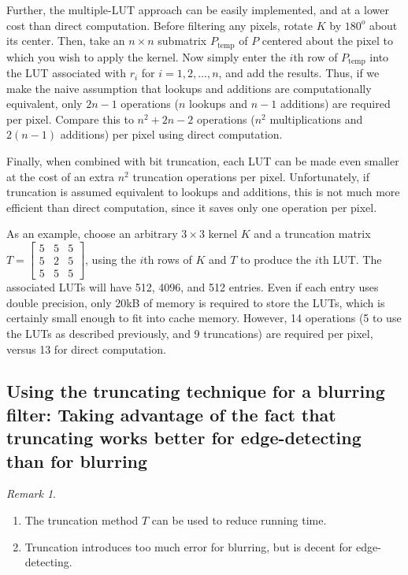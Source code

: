 \documentclass[12pt]{amsart}
\theoremstyle{definition}
\theoremstyle{remark}
\newtheorem{rem}[thm]{Remark}
\numberwithin{thm}{section}
\begin{document}
Further, the multiple-LUT approach can be easily implemented, and at a lower cost than direct computation. Before filtering any pixels, rotate $K$ by $180^o$ about its center. Then, take an $n\times n$ submatrix $P_{\mathrm{temp}}$ of $P$ centered about the pixel to which you wish to apply the kernel. Now simply enter the $i$th row of $P_{\mathrm{temp}}$ into the LUT associated with $r_i$ for $i = 1,2,\ldots,n$, and add the results. Thus, if we make the naive assumption that lookups and additions are computationally equivalent, only $2n-1$ operations ($n$ lookups and $n-1$ additions) are required per pixel. Compare this to $n^2+2n-2$ operations ($n^2$ multiplications and $2(n-1)$ additions) per pixel using direct computation.

Finally, when combined with bit truncation, each LUT can be made even smaller at the cost of an extra $n^2$ truncation operations per pixel. Unfortunately, if truncation is assumed equivalent to lookups and additions, this is not much more efficient than direct computation, since it saves only one operation per pixel. 

As an example, choose an arbitrary $3\times 3$ kernel $K$ and a truncation matrix $T = \left[\begin{smallmatrix}5 & 5 & 5\\5 & 2 & 5\\ 5 & 5 & 5\end{smallmatrix}\right]$, using the $i$th rows of $K$ and $T$ to produce the $i$th LUT. The associated LUTs will have 512, 4096, and 512 entries. Even if each entry uses double precision, only 20kB of memory is required to store the LUTs, which is certainly small enough to fit into cache memory. However, 14 operations (5 to use the LUTs as described previously, and 9 truncations) are required per pixel, versus 13 for direct computation. 

\subsection{Using the truncating technique for a blurring filter: Taking advantage of the fact that truncating works better for edge-detecting than for blurring}

\begin{rem}\label{rem:sharpening_vs_blurring}
\begin{enumerate}
\item The truncation method $T$ can be used to reduce running time.
\item Truncation introduces too much error for blurring, but is decent for edge-detecting.
\end{enumerate}
\end{rem}
\end{document}
